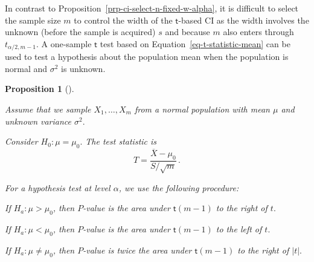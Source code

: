 \documentclass[
  a4paper,
  DIV=11,
  numbers=noendperiod,
  oneside]{scrreprt}
\theoremstyle{definition}
\theoremstyle{definition}
\theoremstyle{plain}
\newtheorem{proposition}{Proposition}[chapter]
\theoremstyle{plain}
\theoremstyle{definition}
\theoremstyle{remark}
\begin{document}
In contrast to Proposition~\ref{prp-ci-select-n-fixed-w-alpha}, it is
difficult to select the sample size \(m\) to control the width of the
\(\mathsf{t}\)-based CI as the width involves the unknown (before the
sample is acquired) \(s\) and because \(m\) also enters through
\(t_{\alpha/2, m-1}.\) A one-sample \(\mathsf{t}\) test based on
Equation~\ref{eq-t-statistic-mean} can be used to test a hypothesis
about the population mean when the population is normal and \(\sigma^2\)
is unknown.

\begin{proposition}[]\protect\hypertarget{prp-htest-mean-normal-var-unknown}{}\label{prp-htest-mean-normal-var-unknown}

Assume that we sample \(X_1, \dots, X_m\) from a normal population with
mean \(\mu\) and unknown variance \(\sigma^2.\)

Consider \(H_0 : \mu = \mu_0.\) The test statistic is \[
 T = \frac{\overline{X} - \mu_0}{S / \sqrt{m}} \,.
\]

For a hypothesis test at level \(\alpha\), we use the following
procedure:

If \(H_a : \mu > \mu_0\), then \(P\)-value is the area under
\(\mathsf{t}(m-1)\) to the right of \(t.\)

If \(H_a : \mu < \mu_0\), then \(P\)-value is the area under
\(\mathsf{t}(m-1)\) to the left of \(t.\)

If \(H_a : \mu \neq \mu_0\), then \(P\)-value is twice the area under
\(\mathsf{t}(m-1)\) to the right of \(|t|.\)

\end{proposition}
\end{document}

